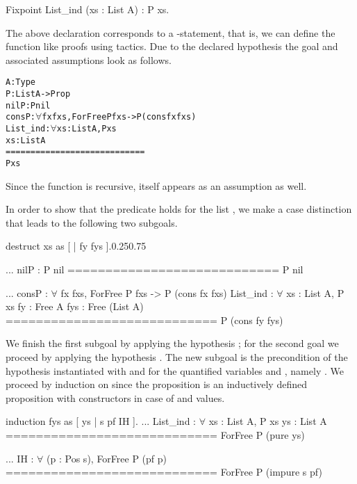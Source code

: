 \begin{coqcode}
Fixpoint List_ind (xs : List A) : P xs.
\end{coqcode}

\noindent%
The above declaration corresponds to a \--statement, that is, we can define the function like proofs using tactics.
Due to the declared hypothesis the goal and associated assumptions look as follows.

\begin{alltt}
  A : Type
  P : List A -> Prop
  nilP : P nil
  consP : \(\forall\) fx fxs, ForFree P fxs -> P (cons fx fxs)
  List_ind : \(\forall\) xs : List A, P xs
  xs : List A
  ============================
  P xs
\end{alltt}

\noindent Since the function is recursive,  itself appears as an assumption as well.

In order to show that the predicate  holds for the list , we make a case distinction that leads to the following two subgoals.

\begin{cproof1}{destruct xs as [ | fy fys ].}{0.25}{0.75}

  ...
  nilP : P nil
  ============================
  P nil

  ...
  consP : \(\forall\) fx fxs, ForFree P fxs -> P (cons fx fxs)
  List_ind : \(\forall\) xs : List A, P xs
  fy : Free A
  fys : Free  (List A)
  ============================
  P (cons fy fys)
\end{cproof1}

\noindent We finish the first subgoal by applying the hypothesis ; for the second goal we proceed by applying the hypothesis .
The new subgoal is the precondition of the hypothesis  instantiated with  and  for the quantified variables  and , namely .
We proceed by induction on  since the proposition  is an inductively defined proposition with constructors in case of  and  values.

\begin{cproof}{induction fys as [ ys | s pf IH ].}
  ...
  List_ind : \(\forall\) xs : List A, P xs
  ys : List A
  ============================
  ForFree P (pure ys)

  ...
  IH : \(\forall\) (p : Pos s), ForFree P (pf p)
  ============================
  ForFree P (impure s pf)
\end{cproof}

